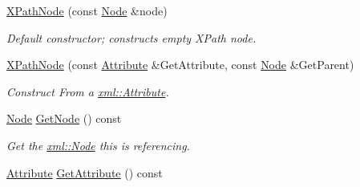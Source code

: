 \begin{DoxyCompactItemize}
\item 
\hyperlink{classphys_1_1xml_1_1XPathNode_ab70dcfefef2107eca2d1932faada475e}{XPathNode} (const \hyperlink{classphys_1_1xml_1_1Node}{Node} \&node)
\begin{DoxyCompactList}\small\item\em Default constructor; constructs empty XPath node. \item\end{DoxyCompactList}\item 
\hyperlink{classphys_1_1xml_1_1XPathNode_a3f9446596022b6e0ab77afc2748c98e0}{XPathNode} (const \hyperlink{classphys_1_1xml_1_1Attribute}{Attribute} \&GetAttribute, const \hyperlink{classphys_1_1xml_1_1Node}{Node} \&GetParent)
\begin{DoxyCompactList}\small\item\em Construct From a \hyperlink{classphys_1_1xml_1_1Attribute}{xml::Attribute}. \item\end{DoxyCompactList}\item 
\hyperlink{classphys_1_1xml_1_1Node}{Node} \hyperlink{classphys_1_1xml_1_1XPathNode_ad34ea7db6cabdfe92656b7d033dbbf35}{GetNode} () const 
\begin{DoxyCompactList}\small\item\em Get the \hyperlink{classphys_1_1xml_1_1Node}{xml::Node} this is referencing. \item\end{DoxyCompactList}\item 
\hypertarget{classphys_1_1xml_1_1XPathNode_a258785388868adf9fa53437cac7cd41c}{
\hyperlink{classphys_1_1xml_1_1Attribute}{Attribute} \hyperlink{classphys_1_1xml_1_1XPathNode_a258785388868adf9fa53437cac7cd41c}{GetAttribute} () const }
\label{df/dd4/classphys_1_1xml_1_1XPathNode_a258785388868adf9fa53437cac7cd41c}


\end{DoxyCompactItemize}
